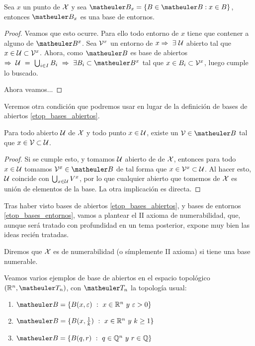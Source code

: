 \begin{prop}
	Sea $x$ un punto de $\mathcal{X}$ y sea $\B_{x} = \{B \in \B : x \in B\}$, entonces $\B_{x}$ es una base de entornos.
\end{prop}
\begin{proof} Veamos que esto ocurre. Para ello todo entorno de $x$ tiene que contener a alguno de $\B^{x}$. Sea $\mathcal{V}^{x}$ un entorno de $x \Rightarrow\ \exists\ \mathcal{U}$ abierto tal que $x \in \mathcal{U} \subset \mathcal{V}^{x}$. Ahora, como $\B$ es base de abiertos $\ra\ \U\ =\ \bigcup_{i\in I}B_i\ \ra\ \exists B_{i} \subset \B^{x}$ tal que $x \in B_{i} \subset \mathcal{V}^{x}$, luego cumple lo buscado.
	
	
	Ahora veamos...%
\end{proof}

Veremos otra condición que podremos usar en lugar de la definición de bases de abiertos \ref{etop_bases_abiertos}.
\begin{obs}
	\label{etop_ref_bases_abiertos}
	Para todo abierto $\mathcal{U}$ de $\mathcal{X}$ y todo punto $x \in \mathcal{U}$, existe un $\V \in \B$ tal que $x \in \mathcal{V} \subset \mathcal{U}$.
\end{obs}
\begin{proof}
	Si se cumple esto, y tomamos $\mathcal{U}$ abierto de de $\mathcal{X}$, entonces para todo $x \in \mathcal{U}$ tomamos $\V^x \in \B$ de tal forma que $x \in \mathcal{V}^x \subset \mathcal{U}$. Al hacer esto, $\mathcal{U}$ coincide con $\bigcup_{x \in \mathcal{U}}V^{x}$, por lo que cualquier abierto que tomemos de $\mathcal{X}$ es unión de elementos de la base. La otra implicación es directa.
\end{proof}
Tras haber visto bases de abiertos \ref{etop_bases_abiertos}, y bases de entornos \ref{etop_bases_entornos}, vamos a plantear el II axioma de numerabilidad, que, aunque será tratado con profundidad en un tema posterior, expone muy bien las ideas recién tratadas.
\begin{defi}
	\label{etop_2_axioma_num}
	Diremos que $\mathcal{X}$ es  de numerabilidad (o símplemente II axioma) si tiene una base numerable.
	\begin{exa}
		Veamos varios ejemplos de base de abiertos en el espacio topológico $(\R^{n},\T_{n})$, con $\T_{n}$ la topología usual:
		\begin{enumerate}
			\item $\B=\{B(x, \varepsilon)\ :\ x \in \R^n\ y \ \varepsilon > 0\}$
			\item $\B=\{B(x, \frac{1}{k})\ :\ x \in \R^n\ y \ k \geq 1\}$
			\item $\B=\{B(q, r)\ :\ q \in \Q^n\ y \ r \in \Q\}$
		\end{enumerate}
	\end{exa}
\end{defi}
